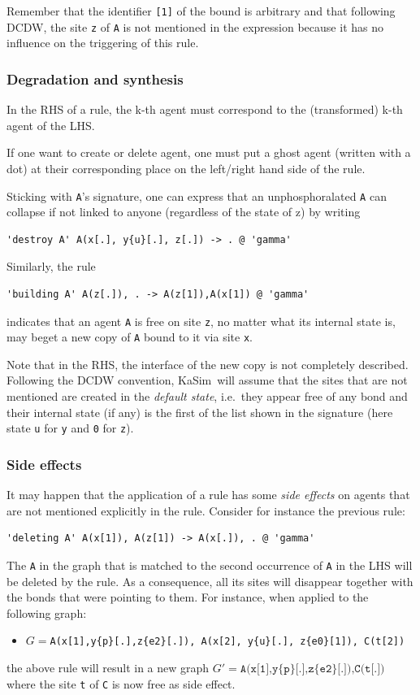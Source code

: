 \documentclass[11pt]{book}
\def\KaSim{\textsf{KaSim}}
\def\ttt#1{\texttt{#1}}
\def\ie{i.e.~}
\def\via{via }
\def\ITE#1{\begin{itemize}#1\end{itemize}}
\begin{document}
Remember that the identifier \ttt{[1]} of the bound is arbitrary and
that following DCDW, the site \ttt{z}
of \ttt{A} is not mentioned in the expression because it has no
influence on the triggering of this rule.

\subsubsection*{Degradation and synthesis}
In the RHS of a rule, the k-th agent must correspond to
the (transformed) k-th agent of the LHS.

If one want to create or delete agent, one must put a ghost agent
(written with a dot) at their corresponding place on the left/right
hand side of the rule.

Sticking with \ttt{A}'s signature, one can
express that an unphosphoralated \ttt{A} can collapse if not linked to
anyone (regardless of the state of z) by writing
\begin{lstlisting}[language=kappa]
'destroy A' A(x[.], y{u}[.], z[.]) -> . @ 'gamma'
\end{lstlisting}

Similarly, the rule
\begin{lstlisting}[language=kappa]
'building A' A(z[.]), . -> A(z[1]),A(x[1]) @ 'gamma'
\end{lstlisting}
indicates that an agent \ttt{A} is free on site \ttt{z}, no matter what
its internal state is, may beget a new copy of \ttt{A} bound to it
\via site \ttt{x}.

Note that in the RHS, the interface of the new copy is not completely
described. Following the DCDW convention, \KaSim~will assume that the sites that are not
mentioned are created in the \emph{default state}, {\ie}they appear free of any bond and their internal state
(if any) is the first of the list shown in the signature (here state \ttt{u} for \ttt{y} and \ttt{0} for \ttt{z}).

\subsubsection*{Side effects}\label{sec:side-effect}

It may happen that the application of a rule has some \emph{side
  effects} on agents that are not mentioned
explicitly in the rule. Consider for instance the previous rule:
\begin{lstlisting}[language=kappa]
'deleting A' A(x[1]), A(z[1]) -> A(x[.]), . @ 'gamma'
\end{lstlisting}
The \ttt{A} in the graph that is matched to the second occurrence of
\ttt{A} in the LHS will be deleted by the rule. As a consequence, all
its sites will disappear together with the bonds that were pointing to
them. For instance, when applied to the following graph: \ITE{
\item[] $G=$\ttt{A(x[1],y\{p\}[.],z\{e2\}[.]), A(x[2], y\{u\}[.],
  z\{e0\}[1]), C(t[2])} } the above rule will result in a new graph
$G' =\ttt{A(x[1],y\{p\}[.],z\{e2\}[.]),C(t[.])}$ where the site
\ttt{t} of \ttt{C} is now free as side effect.
\end{document}
